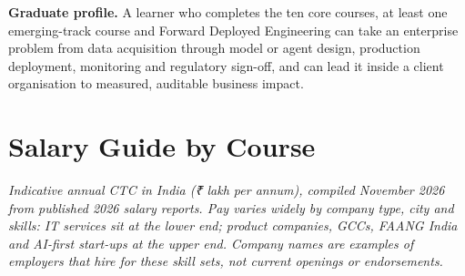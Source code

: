 \documentclass[10pt,a4paper]{article}
\begin{document}
\begin{tcolorbox}[colback=goldbg,colframe=goldl,arc=2pt,boxrule=0.6pt]\small\textbf{Graduate profile.} A learner who completes the ten core courses, at least one emerging-track course and Forward Deployed Engineering can take an enterprise problem from data acquisition through model or agent design, production deployment, monitoring and regulatory sign-off, and can lead it inside a client organisation to measured, auditable business impact.\end{tcolorbox}
\newpage\section*{Salary Guide by Course}
{\small\itshape Indicative annual CTC in India (₹ lakh per annum), compiled November 2026 from published 2026 salary reports. Pay varies widely by company type, city and skills: IT services sit at the lower end; product companies, GCCs, FAANG India and AI-first start-ups at the upper end. Company names are examples of employers that hire for these skill sets, not current openings or endorsements.}
\end{document}
